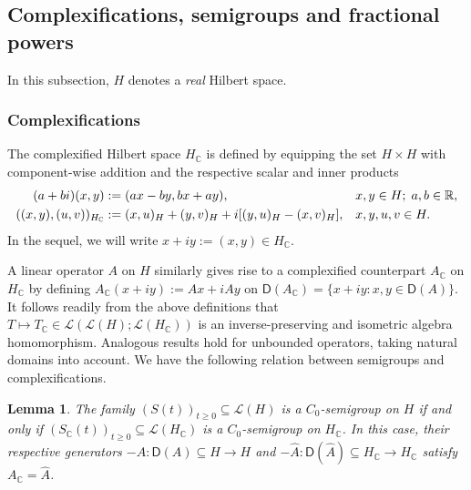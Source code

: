 \documentclass[reqno]{amsart}
\numberwithin{equation}{section}
\newcommand{\R}{\mathbb{R}}
\newcommand{\C}{\mathbb{C}}
\newcommand{\from}{\colon}
\newtheorem{lemma}{Lemma}[section]
\theoremstyle{remark}
\theoremstyle{definition}
\begin{document}
\subsection{Complexifications, semigroups and fractional powers}
\label{subsec:functional-calc:real}

In this subsection, 
$H$ denotes a \emph{real} Hilbert space. 

\subsubsection{Complexifications}\label{subsubsec:functional-calc:complexification} 

The complexified Hilbert space
$H_\C$ is defined by equipping the set $H\times H$
with
component-wise addition and the respective scalar and 
inner products
%
\begin{align}
(a+bi)(x,y) &:= (a x- by, bx + ay), 
&&x,y\in H;\; a,b\in \R, 
\notag \\
((x,y),(u,v))_{H_\C}
&:= 
(x,u)_H
+
(y,v)_H
+
i
[
(y,u)_H
-
(x,v)_H]
, &&x,y,u,v\in H.
\label{eq:inner-product-HC}
\end{align}
%
In the sequel, we will write $x + iy := (x,y) \in H_\C$. 

A linear operator $A$ on $H$ similarly gives
rise to a complexified counterpart $A_\C$ on $H_\C$
by defining 
$A_\C(x+iy) := Ax + i Ay$ on
$\mathsf D(A_\C) = \{x + iy : x, y \in \mathsf D(A)\}$. 
It
follows readily from the above definitions that
$T \mapsto T_\C \in \mathscr L(\mathscr L(H);\mathscr L(H_\C))$
is an inverse-preserving and isometric algebra homomorphism.
Analogous results hold for unbounded operators, 
taking natural domains into account. 
We have the following relation between semigroups and complexifications.

\begin{lemma}\label{lem:complexifications-semigroups}
	The family
	$(S(t))_{t\ge0} \subseteq \mathscr L(H)$ 
	is a $C_0$-semigroup on $H$ if and only if
	$(S_\C(t))_{t\ge0} \subseteq \mathscr L(H_\C)$ 
	is a $C_0$-semigroup on $H_\C$.
	In this case, their respective generators
	$-A \from \mathsf D(A) \subseteq H \to H$ and 
	$-\widehat A \from \mathsf D(\widehat A) \subseteq H_\C \to H_\C$ 
	satisfy $A_\C = \widehat A$.
\end{lemma}
\end{document}

